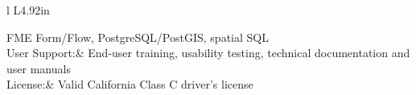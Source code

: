 \documentclass[letterpaper]{article}
\newenvironment{skillslist}
        {
            \hspace*{-0.07in}\begin{tabular}[t]{ l L{4.92in} }
        }{
            \end{tabular}
        }
\newcommand{\impt}[1]{\uline{#1}}
\begin{document}
\begin{skillslist}
            FME Form/Flow, PostgreSQL/PostGIS, spatial SQL
            \\[15pt]
        User Support:&
            End-user training, usability testing, \linebreak
            technical documentation and user manuals
            \\[15pt]
        License:&
            Valid California Class C driver's license

\end{skillslist}
\end{document}
